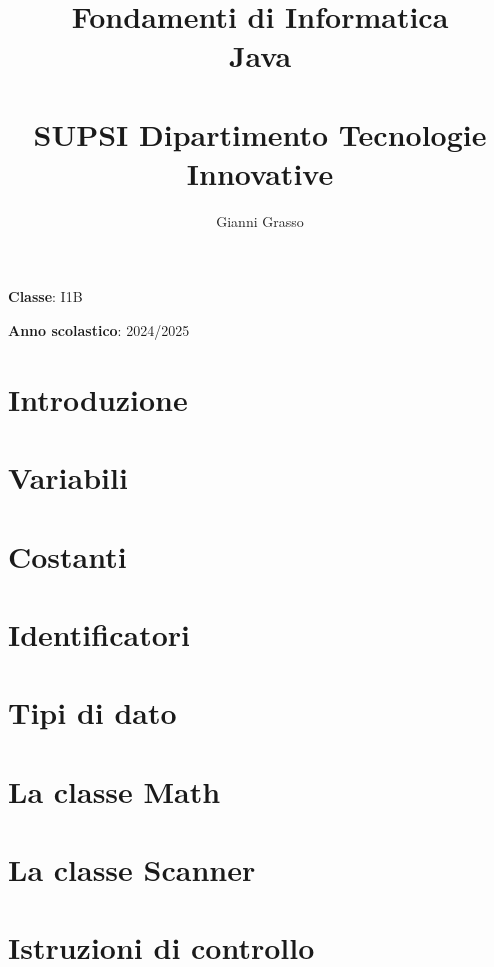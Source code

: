 \documentclass{article}
\title{
    Fondamenti di Informatica \\
    Java \\
    \phantom{}\\
    \large SUPSI Dipartimento Tecnologie Innovative
}
\author{Gianni Grasso}
\begin{document}
\maketitle
\hphantom{ }
\vspace{14.5cm}

\textbf{Classe}: I1B

\textbf{Anno scolastico}: 2024/2025
\pagebreak


\tableofcontents
\pagebreak

\section{Introduzione}

\pagebreak

\section{Variabili}

\pagebreak

\section{Costanti}

\pagebreak

\section{Identificatori}

\pagebreak

\section{Tipi di dato}

\pagebreak

\section{La classe Math}

\pagebreak

\section{La classe Scanner}

\pagebreak

\section{Istruzioni di controllo}

\pagebreak
\end{document}
